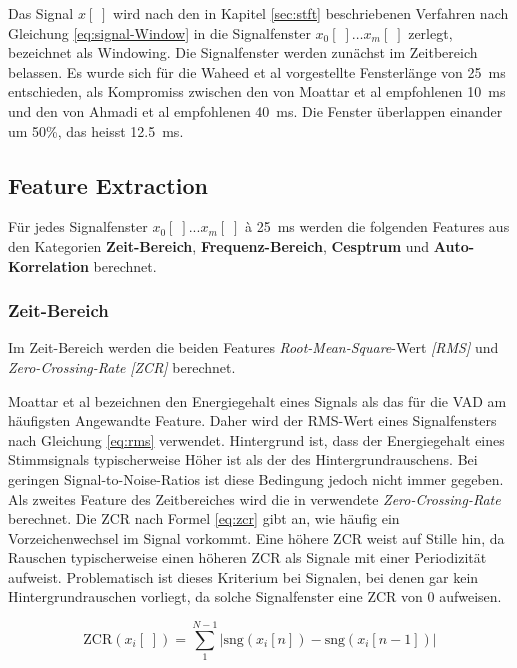 Das Signal $x[\;]$ wird nach den in Kapitel \ref{sec:stft} beschriebenen Verfahren nach Gleichung \ref{eq:signal-Window} in die Signalfenster $x_0[\;] \ldots x_m[\;]$ zerlegt, bezeichnet als \glqq Windowing\grqq{}. Die Signalfenster werden zunächst im Zeitbereich belassen. Es wurde sich für die Waheed et al \cite{vad_entropy} vorgestellte Fensterlänge von \SI{25}{\milli\second} entschieden, als Kompromiss zwischen den von Moattar et al\cite{vad_Easy} empfohlenen \SI{10}{\milli\second} und den von Ahmadi et al \cite{vad_ceps} empfohlenen \SI{40}{\milli\second}. Die Fenster überlappen einander um 50\%, das heisst \SI{12.5}{\milli\second}.

\subsection{Feature Extraction}
\label{sec:featExtraction}

Für jedes Signalfenster $x_0[\;]...x_m[\;]$ à \SI{25}{\milli\second} werden die folgenden Features aus den Kategorien \textbf{Zeit-Bereich}, \textbf{Frequenz-Bereich}, \textbf{Cesptrum} und \textbf{Auto-Korrelation} berechnet.

\subsubsection{Zeit-Bereich}
\label{sec:timeFeats}

Im Zeit-Bereich werden die beiden Features \emph{Root-Mean-Square}-Wert \emph{[RMS]} und \emph{Zero-Crossing-Rate} \emph{[ZCR]} berechnet. 

Moattar et al \cite{vad_Easy} bezeichnen den Energiegehalt eines Signals als das für die VAD am häufigsten Angewandte Feature. Daher wird der RMS-Wert eines Signalfensters nach Gleichung \ref{eq:rms} verwendet. Hintergrund ist, dass der Energiegehalt eines Stimmsignals typischerweise Höher ist als der des Hintergrundrauschens. Bei geringen Signal-to-Noise-Ratios ist diese Bedingung jedoch nicht immer gegeben. Als zweites Feature des Zeitbereiches wird die in verwendete \emph{Zero-Crossing-Rate} berechnet. Die ZCR nach Formel \ref{eq:zcr} gibt an, wie häufig ein Vorzeichenwechsel im Signal vorkommt. Eine höhere ZCR weist auf Stille hin, da Rauschen typischerweise einen höheren ZCR als Signale mit einer Periodizität aufweist. Problematisch ist dieses Kriterium bei Signalen, bei denen gar kein Hintergrundrauschen vorliegt, da solche Signalfenster eine ZCR von 0 aufweisen. \cite{vad_ceps} 

\begin{equation}
\text{ZCR}(x_i[\;]) = \sum_{1}^{N-1}|\text{sng}(x_i[n])-\text{sng}(x_i[n-1])|
\label{eq:zcr}
\end{equation}

